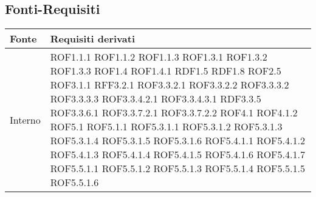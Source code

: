 \subsection{Fonti-Requisiti} %
\label{ssub:fonti_requisiti}
\begin{center}
\def\arraystretch{1.5}
\bgroup
\begin{longtable}{| p{4cm} | p{4cm} |}
\hline
\textbf{Fonte} & \textbf{Requisiti derivati} \\
\hline
Interno & ROF1.1.1 \newline ROF1.1.2 \newline ROF1.1.3 \newline ROF1.3.1 \newline ROF1.3.2 \newline ROF1.3.3 \newline ROF1.4 \newline ROF1.4.1 \newline RDF1.5 \newline RDF1.8 \newline ROF2.5 \newline ROF3.1.1 \newline RFF3.2.1 \newline ROF3.3.2.1 \newline ROF3.3.2.2 \newline ROF3.3.3.2 \newline ROF3.3.3.3 \newline ROF3.3.4.2.1 \newline ROF3.3.4.3.1 \newline RDF3.3.5 \newline ROF3.3.6.1 \newline ROF3.3.7.2.1 \newline ROF3.3.7.2.2 \newline ROF4.1 \newline ROF4.1.2 \newline ROF5.1 \newline ROF5.1.1 \newline ROF5.3.1.1 \newline ROF5.3.1.2 \newline ROF5.3.1.3 \newline ROF5.3.1.4 \newline ROF5.3.1.5 \newline ROF5.3.1.6 \newline ROF5.4.1.1 \newline ROF5.4.1.2 \newline ROF5.4.1.3 \newline ROF5.4.1.4 \newline ROF5.4.1.5 \newline ROF5.4.1.6 \newline ROF5.4.1.7 \newline ROF5.5.1.1 \newline ROF5.5.1.2 \newline ROF5.5.1.3 \newline ROF5.5.1.4 \newline ROF5.5.1.5 \newline ROF5.5.1.6 \\

\end{longtable}
\end{center}
